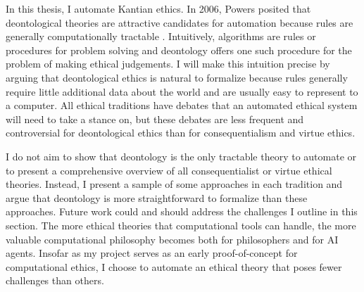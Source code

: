 %
\begin{isabellebody}%
%
%
\isadelimtheory
%
\endisadelimtheory
%
\isatagtheory
%
\endisatagtheory
{\isafoldtheory}%
%
\isadelimtheory
%
\endisadelimtheory
%
\isadelimdocument
%
\endisadelimdocument
%
\isatagdocument
%
\isamarkuptrue%
%
\endisatagdocument
{\isafolddocument}%
%
\isadelimdocument
%
\endisadelimdocument
%
\begin{isamarkuptext}%
In this thesis, I automate Kantian ethics. In 2006, Powers posited that deontological theories are 
attractive candidates for automation because rules are generally computationally tractable \cite[1]{powers}. 
Intuitively, algorithms are rules or procedures for problem solving and deontology offers one such 
procedure for the problem of making ethical judgements. I will make this intuition precise by
arguing that deontological ethics is natural to formalize because rules generally require little additional
data about the world and are usually easy to represent to a computer. All ethical traditions have debates that an 
automated ethical system will need to take a stance on, but these debates are less frequent and controversial
for deontological ethics than for consequentialism and virtue ethics.

I do not aim to show that deontology is the only tractable theory to automate or
to present a comprehensive overview of all consequentialist or virtue ethical theories. Instead, I 
present a sample of some approaches in each tradition and argue that deontology is more straightforward 
to formalize than these approaches. Future work could and should address the challenges I outline in 
this section. The more ethical theories that computational tools can handle, the more valuable 
computational philosophy becomes both for philosophers and for AI agents. Insofar as my project serves 
as an early proof-of-concept for computational ethics, I choose to automate an ethical theory that 
poses fewer challenges than others.


\end{isamarkuptext}
\end{isabellebody}
